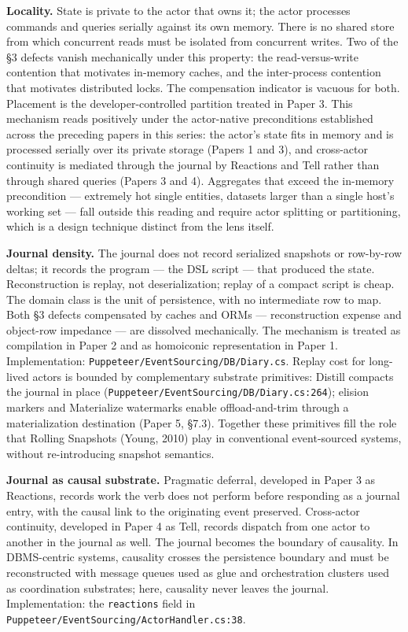 \documentclass[
]{article}
\begin{document}
\textbf{Locality.} State is private to the actor that owns it; the actor
processes commands and queries serially against its own memory. There is
no shared store from which concurrent reads must be isolated from
concurrent writes. Two of the §3 defects vanish mechanically under this
property: the read-versus-write contention that motivates in-memory
caches, and the inter-process contention that motivates distributed
locks. The compensation indicator is vacuous for both. Placement is the
developer-controlled partition treated in Paper 3. This mechanism reads
positively under the actor-native preconditions established across the
preceding papers in this series: the actor's state fits in memory and is
processed serially over its private storage (Papers 1 and 3), and
cross-actor continuity is mediated through the journal by Reactions and
Tell rather than through shared queries (Papers 3 and 4). Aggregates
that exceed the in-memory precondition --- extremely hot single
entities, datasets larger than a single host's working set --- fall
outside this reading and require actor splitting or partitioning, which
is a design technique distinct from the lens itself.

\textbf{Journal density.} The journal does not record serialized
snapshots or row-by-row deltas; it records the program --- the DSL
script --- that produced the state. Reconstruction is replay, not
deserialization; replay of a compact script is cheap. The domain class
is the unit of persistence, with no intermediate row to map. Both §3
defects compensated by caches and ORMs --- reconstruction expense and
object-row impedance --- are dissolved mechanically. The mechanism is
treated as compilation in Paper 2 and as homoiconic representation in
Paper 1. Implementation: \texttt{Puppeteer/EventSourcing/DB/Diary.cs}.
Replay cost for long-lived actors is bounded by complementary substrate
primitives: Distill compacts the journal in place
(\texttt{Puppeteer/EventSourcing/DB/Diary.cs:264}); elision markers and
Materialize watermarks enable offload-and-trim through a materialization
destination (Paper 5, §7.3). Together these primitives fill the role
that Rolling Snapshots (Young, 2010) play in conventional event-sourced
systems, without re-introducing snapshot semantics.

\textbf{Journal as causal substrate.} Pragmatic deferral, developed in
Paper 3 as Reactions, records work the verb does not perform before
responding as a journal entry, with the causal link to the originating
event preserved. Cross-actor continuity, developed in Paper 4 as Tell,
records dispatch from one actor to another in the journal as well. The
journal becomes the boundary of causality. In DBMS-centric systems,
causality crosses the persistence boundary and must be reconstructed
with message queues used as glue and orchestration clusters used as
coordination substrates; here, causality never leaves the journal.
Implementation: the \texttt{reactions} field in
\texttt{Puppeteer/EventSourcing/ActorHandler.cs:38}.
\end{document}
